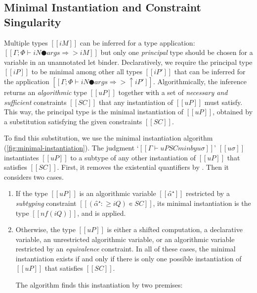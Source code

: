 \subsection{Minimal Instantiation and Constraint Singularity}
\label{sec:constraint-singularity}

Multiple types $[[iM]]$ can be inferred for a type application:
$[[Γ ; Φ ⊢ iN ● args ⇒> iM]]$ but only one \emph{principal} 
type should be chosen for a variable in an unannotated let binder.
Declaratively, we require the principal type $[[iP]]$ to be
minimal among other all types $[[iP']]$ that can be inferred
for the application $[[Γ ; Φ ⊢ iN ● args ⇒> ↑iP']]$.
Algorithmically, the inference returns an
\emph{algorithmic} type $[[uP]]$ 
together with a set of \emph{necessary and sufficient} 
constraints $[[SC]]$ that any instantiation of $[[uP]]$ must satisfy.
This way, the principal type is the minimal instantiation of $[[uP]]$,
obtained by a substitution satisfying the given constraints $[[SC]]$. 

To find this substitution, we use the minimal instantiation
algorithm (\cref{fig:minimal-instantiation}). The judgment `$[[Γ ⊢ uP SC minby uσ]]$'
$[[uσ]]$ instantiates $[[uP]]$ to a subtype of any other 
instantiation of $[[uP]]$ that satisfies $[[SC]]$. 
First, it removes the existential quantifiers by .
Then it considers two cases. 
\begin{enumerate}
  \item If the type $[[uP]]$ is an algorithmic variable $[[α̂⁺]]$
    restricted by a \emph{subtyping} constraint $[[(α̂⁺ :≥ iQ) ∊ SC]]$,
    its minimal instantiation is the type $[[nf(iQ)]]$, and 
     is applied.
  \item Otherwise, the type $[[uP]]$ is either a shifted computation, a
    declarative variable, an unrestricted algorithmic variable, or an
    algorithmic variable restricted by an \emph{equivalence} constraint. In all
    of these cases, the minimal instantiation exists if and only if there is
    only one possible instantiation of $[[uP]]$ that satisfies $[[SC]]$.
    
    The algorithm finds this instantiation by two premises:
  \end{enumerate}


